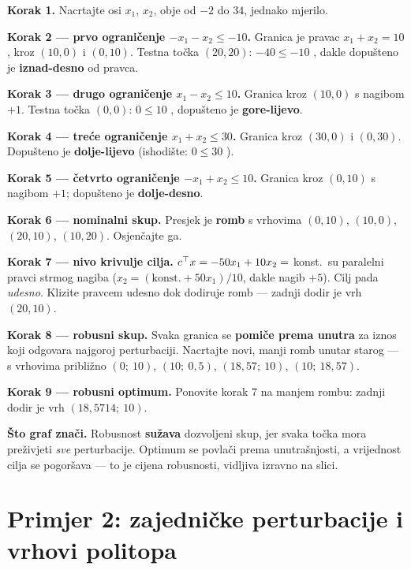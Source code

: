 \begin{crtanje}
\textbf{Korak 1.} Nacrtajte osi $x_1$, $x_2$, obje od $-2$ do $34$, jednako
mjerilo.

\textbf{Korak 2 --- prvo ograničenje $-x_1-x_2 \le -10$.} Granica je pravac
$x_1 + x_2 = 10$, kroz $(10,0)$ i $(0,10)$. Testna točka $(20,20)$:
$-40 \le -10$ \checkmark, dakle dopušteno je \textbf{iznad-desno} od pravca.

\textbf{Korak 3 --- drugo ograničenje $x_1 - x_2 \le 10$.} Granica kroz
$(10,0)$ s nagibom $+1$. Testna točka $(0,0)$: $0 \le 10$ \checkmark, dopušteno
je \textbf{gore-lijevo}.

\textbf{Korak 4 --- treće ograničenje $x_1 + x_2 \le 30$.} Granica kroz
$(30,0)$ i $(0,30)$. Dopušteno je \textbf{dolje-lijevo} (ishodište:
$0 \le 30$ \checkmark).

\textbf{Korak 5 --- četvrto ograničenje $-x_1 + x_2 \le 10$.} Granica kroz
$(0,10)$ s nagibom $+1$; dopušteno je \textbf{dolje-desno}.

\textbf{Korak 6 --- nominalni skup.} Presjek je \textbf{romb} s vrhovima
$(0,10)$, $(10,0)$, $(20,10)$, $(10,20)$. Osjenčajte ga.

\textbf{Korak 7 --- nivo krivulje cilja.} $c^{\top} x = -50x_1 + 10x_2 = $ konst.\
su paralelni pravci strmog nagiba ($x_2 = (\text{konst.} + 50x_1)/10$, dakle
nagib $+5$). Cilj pada \emph{udesno}. Klizite pravcem udesno dok dodiruje
romb --- zadnji dodir je vrh $(20,10)$.

\textbf{Korak 8 --- robusni skup.} Svaka granica se \textbf{pomiče prema
unutra} za iznos koji odgovara najgoroj perturbaciji. Nacrtajte novi, manji
romb unutar starog --- s vrhovima približno $(0;\ 10)$, $(10;\ 0{,}5)$,
$(18{,}57;\ 10)$, $(10;\ 18{,}57)$.

\textbf{Korak 9 --- robusni optimum.} Ponovite korak 7 na manjem rombu: zadnji
dodir je vrh $(18{,}5714;\ 10)$.

\textbf{Što graf znači.} Robusnost \textbf{sužava} dozvoljeni skup, jer svaka
točka mora preživjeti \emph{sve} perturbacije. Optimum se povlači prema
unutrašnjosti, a vrijednost cilja se pogoršava --- to je cijena robusnosti,
vidljiva izravno na slici.
\end{crtanje}

\section{Primjer 2: zajedničke perturbacije i vrhovi politopa}
\label{sec:robusno-primjer2}

